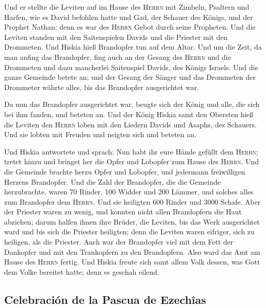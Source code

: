  Und er stellte die Leviten auf im Hause des
\textsc{Herrn} mit Zimbeln, Psaltern und Harfen, wie es David befohlen
hatte und Gad, der Schauer des Königs, und der Prophet Nathan; denn es
war des \textsc{Herrn} Gebot durch seine Propheten.  Und
die Leviten standen mit den Saitenspielen Davids und die Priester mit
den Drommeten.  Und Hiskia hieß Brandopfer tun auf dem
Altar. Und um die Zeit, da man anfing das Brandopfer, fing auch an der
Gesang des \textsc{Herrn} und die Drommeten und dazu mancherlei
Saitenspiel Davids, des Königs Israels.  Und die ganze
Gemeinde betete an; und der Gesang der Sänger und das Drommeten der
Drommeter währte alles, bis das Brandopfer ausgerichtet war.

 Da nun das Brandopfer ausgerichtet war, beugte sich der
König und alle, die sich bei ihm fanden, und beteten an. 
Und der König Hiskia samt den Obersten hieß die Leviten den
\textsc{Herrn} loben mit den Liedern Davids und Asaphs, des Schauers.
Und sie lobten mit Freuden und neigten sich und beteten an.

 Und Hiskia antwortete und sprach: Nun habt ihr eure
Hände gefüllt dem \textsc{Herrn}; tretet hinzu und bringet her die Opfer
und Lobopfer zum Hause des \textsc{Herrn}. Und die Gemeinde brachte
herzu Opfer und Lobopfer, und jedermann freiwilligen Herzens Brandopfer.
 Und die Zahl der Brandopfer, die die Gemeinde
herzubrachte, waren 70 Rinder, 100 Widder und 200 Lämmer, und solches
alles zum Brandopfer dem \textsc{Herrn}.  Und sie
heiligten 600 Rinder und 3000 Schafe.  Aber der Priester
waren zu wenig, und konnten nicht allen Brandopfern die Haut abziehen;
darum halfen ihnen ihre Brüder, die Leviten, bis das Werk ausgerichtet
ward und bis sich die Priester heiligten; denn die Leviten waren
eifriger, sich zu heiligen, als die Priester.  Auch war
der Brandopfer viel mit dem Fett der Dankopfer und mit den Trankopfern
zu den Brandopfern. Also ward das Amt am Hause des \textsc{Herrn}
fertig.  Und Hiskia freute sich samt allem Volk dessen,
was Gott dem Volke bereitet hatte; denn es geschah eilend.

\hypertarget{celebraciuxf3n-de-la-pascua-de-ezechuxeeas}{%
\subsection{Celebración de la Pascua de
Ezechîas}\label{celebraciuxf3n-de-la-pascua-de-ezechuxeeas}}

